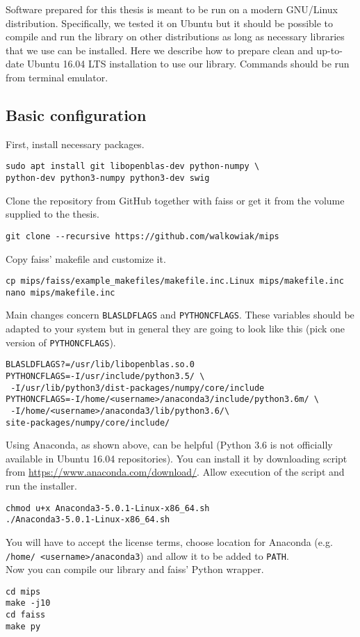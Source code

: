Software prepared for this thesis is meant to be run on a modern GNU/Linux distribution.
Specifically, we tested it on Ubuntu but it should be possible to compile and run the library on other distributions as long as necessary libraries that we use can be installed.
Here we describe how to prepare clean and up-to-date Ubuntu 16.04 LTS installation to use our library.
Commands should be run from terminal emulator.
\subsection{Basic configuration}
\noindent
First, install necessary packages.
\begin{verbatim}
sudo apt install git libopenblas-dev python-numpy \
python-dev python3-numpy python3-dev swig
\end{verbatim}
Clone the repository from GitHub together with faiss or get it from the volume supplied to the thesis.
\begin{verbatim}
git clone --recursive https://github.com/walkowiak/mips
\end{verbatim}
Copy faiss' makefile and customize it.
\begin{verbatim}
cp mips/faiss/example_makefiles/makefile.inc.Linux mips/makefile.inc
nano mips/makefile.inc
\end{verbatim}
Main changes concern \texttt{BLASLDFLAGS} and \texttt{PYTHONCFLAGS}.
These variables should be adapted to your system but in general they are going to look like this (pick one version of \texttt{PYTHONCFLAGS}).
\begin{verbatim}
BLASLDFLAGS?=/usr/lib/libopenblas.so.0
PYTHONCFLAGS=-I/usr/include/python3.5/ \
 -I/usr/lib/python3/dist-packages/numpy/core/include
PYTHONCFLAGS=-I/home/<username>/anaconda3/include/python3.6m/ \
 -I/home/<username>/anaconda3/lib/python3.6/\
site-packages/numpy/core/include/
\end{verbatim}
Using Anaconda, as shown above, can be helpful (Python 3.6 is not officially available in Ubuntu 16.04 repositories). You can install it by downloading script from \url{https://www.anaconda.com/download/}.
Allow execution of the script and run the installer.
\begin{verbatim}
chmod u+x Anaconda3-5.0.1-Linux-x86_64.sh
./Anaconda3-5.0.1-Linux-x86_64.sh
\end{verbatim}
You will have to accept the license terms, choose location for Anaconda (e.g. \texttt{/home/ <username>/anaconda3}) and allow it to be added to \texttt{PATH}.\\
Now you can compile our library and faiss' Python wrapper.
\begin{verbatim}
cd mips
make -j10
cd faiss
make py
\end{verbatim}
